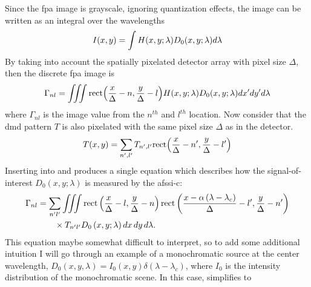Since the \gls{fpa} image is grayscale, ignoring quantization effects, the image can be written as an integral over the wavelengths
%
\begin{equation}
	I\ap{x,y} = \int H \ap{x,y;\lambda}  D_0 \ap{x,y;\lambda} d\lambda
\end{equation}
%
By taking into account the spatially pixelated detector array with pixel size $\Delta$, then the discrete \gls{fpa} image is
%
\begin{equation}
	\Gamma_{nl} = \iiint \mbox{rect} \ap{ \frac{x}{\Delta} - n, \frac{y}{\Delta} - l } H \ap{x,y;\lambda} D_0 \ap{x,y;\lambda} dx^\prime dy^\prime d\lambda
	\label{eq:afssicDiscreteReadout}
\end{equation}
%
where $\Gamma_{nl}$ is the image value from the $n^{th}$ and $l^{th}$ location. Now consider that the \gls{dmd} pattern $T$ is also pixelated with the same pixel size $\Delta$ as in the detector. 
%
\begin{equation}
	T \ap{x,y} = \sum_{n^\prime, l^\prime}  T_{n^\prime, l^\prime} \mbox{rect} \ap{ \frac{x}{\Delta} - n^\prime, \frac{y}{\Delta} - l^\prime}
	\label{eq:afssicDiscreteDMD}
\end{equation}
%
Inserting  into  and  produces a single equation which describes how the signal-of-interest $D_0 \left( x, y; \lambda \right)$ is measured by the \gls{afssi-c}:
%
\begin{align} \label{eq:PixelizedDetectIntensity}
	\Gamma_{nl} &= \sum_{n^\prime l^\prime} \iiint \mbox{rect} \left( \frac{x}{\Delta} - l, \frac{y}{\Delta} - n \right) \mbox{rect} \left( \frac{x-\alpha \left(\lambda - \lambda_c\right)}{\Delta} - l^\prime , \frac{y}{\Delta} - n^\prime \right) \notag \\
 	&\qquad \times T_{n^\prime l^\prime} D_0 \left( x, y; \lambda \right) dx \, dy \, d\lambda.
\end{align}
%
This equation maybe somewhat difficult to interpret, so to add some additional intuition I will go through an example of a monochromatic source at the center wavelength, $D_0 \left(x, y, \lambda\right) = I_0 \left(x, y \right) \delta \left( \lambda - \lambda_c \right)$, where $I_0$ is the intensity distribution of the monochromatic scene. In this case,  simplifies to
%
%
